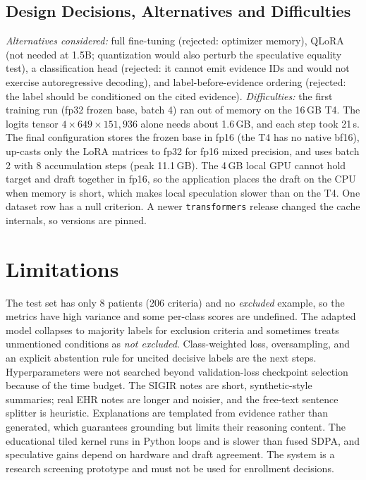 \documentclass[conference]{IEEEtran}
\begin{document}
\subsection{Design Decisions, Alternatives and Difficulties}
\emph{Alternatives considered:} full fine-tuning (rejected: optimizer memory), QLoRA (not needed at 1.5B;
quantization would also perturb the speculative equality test), a classification head (rejected: it
cannot emit evidence IDs and would not exercise autoregressive decoding), and label-before-evidence
ordering (rejected: the label should be conditioned on the cited evidence).
\emph{Difficulties:} the first training run (fp32 frozen base, batch 4) ran out of memory on the 16\,GB T4.
The logits tensor $4\times649\times151{,}936$ alone needs about 1.6\,GB, and each step took 21\,s. The final
configuration stores the frozen base in fp16 (the T4 has no native bf16), up-casts only the LoRA matrices to
fp32 for fp16 mixed precision, and uses batch 2 with 8 accumulation steps (peak 11.1\,GB). The
4\,GB local GPU cannot hold target and draft together in fp16, so the application places the draft on the
CPU when memory is short, which makes local speculation slower than on the T4. One dataset row has a null
criterion. A newer \texttt{transformers} release changed the cache internals, so versions are pinned.

\section{Limitations}
The test set has only 8 patients (206 criteria) and no \emph{excluded} example, so the metrics have
high variance and some per-class scores are undefined. The adapted model collapses to majority labels for
exclusion criteria and sometimes treats unmentioned conditions as \emph{not excluded}. Class-weighted loss,
oversampling, and an explicit abstention rule for uncited decisive labels are the next steps. Hyperparameters
were not searched beyond validation-loss checkpoint selection because of the time budget. The SIGIR notes are short, synthetic-style
summaries; real EHR notes are longer and noisier, and the free-text sentence splitter is heuristic.
Explanations are templated from evidence rather than generated, which guarantees grounding but
limits their reasoning content. The educational tiled kernel runs in Python loops and is slower than
fused SDPA, and speculative gains depend on hardware and draft agreement. The system is a research
screening prototype and must not be used for enrollment decisions.
\end{document}
